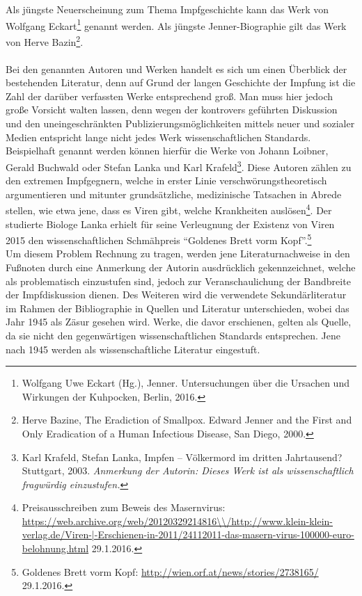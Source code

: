 \documentclass[
    a4paper,
    12pt,
    hyphens,
    chapterprefix=true,
    headheight=33pt,
    footheight=29pt,
    headings=optiontohead, %
]{scrartcl}
\begin{document}
Als jüngste Neuerscheinung zum Thema Impfgeschichte kann das Werk von Wolfgang Eckart\footnote{Wolfgang Uwe Eckart (Hg.), Jenner. Untersuchungen über die Ursachen und Wirkungen der Kuhpocken, Berlin, 2016.} genannt werden. Als jüngste Jenner-Biographie gilt das Werk von Herve Bazin\footnote{Herve Bazine, The Eradiction of Smallpox. Edward Jenner and the First and Only Eradication of a Human Infectious Disease, San Diego, 2000.}.\\
\\
Bei den genannten Autoren und Werken handelt es sich um einen Überblick der bestehenden Literatur, denn auf Grund der langen Geschichte der Impfung ist die Zahl der darüber verfassten Werke entsprechend groß. Man muss hier jedoch große Vorsicht walten lassen, denn wegen der kontrovers geführten Diskussion und den uneingeschränkten Publizierungsmöglichkeiten mittels neuer und sozialer Medien entspricht lange nicht jedes Werk wissenschaftlichen Standards. Beispielhaft genannt werden können hierfür die Werke von Johann Loibner, Gerald Buchwald oder Stefan Lanka und Karl Krafeld\footnote{Karl Krafeld, Stefan Lanka, Impfen -- Völkermord im dritten Jahrtausend? Stuttgart, 2003. \textit{Anmerkung der Autorin: Dieses Werk ist als wissenschaftlich fragwürdig einzustufen.}}. Diese Autoren zählen zu den extremen Impfgegnern, welche in erster Linie verschwörungstheoretisch argumentieren und mitunter grundsätzliche, medizinische Tatsachen in Abrede stellen, wie etwa jene, dass es Viren gibt, welche Krankheiten auslösen\footnote{Preisausschreiben zum Beweis des Masernvirus: \url{https://web.archive.org/web/20120329214816\\/http://www.klein-klein-verlag.de/Viren-|-Erschienen-in-2011/24112011-das-masern-virus-100000-euro-belohnung.html} 29.1.2016.}. Der studierte Biologe Lanka erhielt für seine Verleugnung der Existenz von Viren 2015 den wissenschaftlichen Schmähpreis "`Goldenes Brett vorm Kopf"'.\footnote{Goldenes Brett vorm Kopf: \url{http://wien.orf.at/news/stories/2738165/} 29.1.2016.}\\ 
Um diesem Problem Rechnung zu tragen, werden jene Literaturnachweise in den Fußnoten durch eine Anmerkung der Autorin ausdrücklich gekennzeichnet, welche als problematisch einzustufen sind, jedoch zur Veranschaulichung der Bandbreite der Impfdiskussion dienen. Des Weiteren wird die verwendete Sekundärliteratur im Rahmen der Bibliographie in Quellen und Literatur unterschieden, wobei das Jahr 1945 als Zäsur gesehen wird. Werke, die davor erschienen, gelten als Quelle, da sie nicht den gegenwärtigen wissenschaftlichen Standards entsprechen. Jene nach 1945 werden als wissenschaftliche Literatur eingestuft.\\
\end{document}
